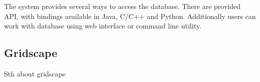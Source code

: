 The system provides several ways to access the database. There are provided API, with bindings available in Java, C/C++ and Python. Additionally users can work with database using web interface or command line utility.




\subsection{Gridscape}

Sth about gridscape \cite{GRIDSCAPE1, GRIDSCAPE2, GRIDSCAPE3}